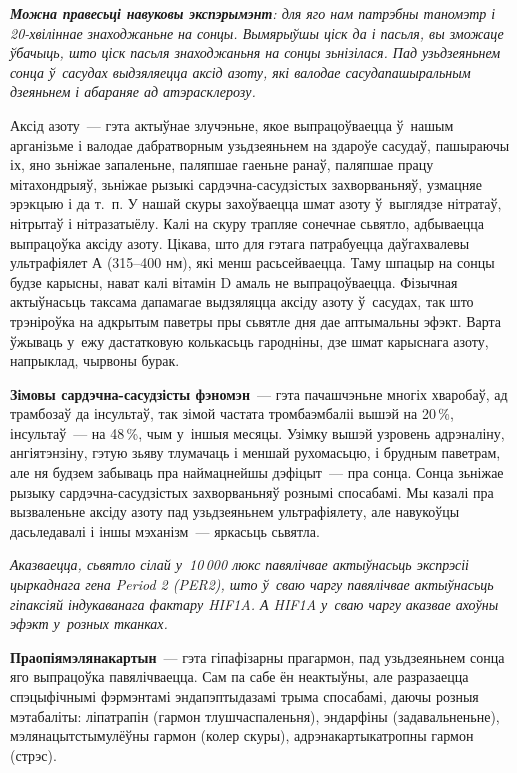 \emph{\textbf{Можна правесьці навуковы экспэрымэнт}: для яго нам патрэбны таномэтр і 20-хвіліннае знаходжаньне на сонцы. Вымярыўшы ціск да і пасьля, вы зможаце ўбачыць, што ціск пасьля знаходжаньня на сонцы зьнізілася. Пад узьдзеяньнем сонца ў~сасудах выдзяляецца аксід азоту, які валодае сасудапашыральным дзеяньнем і абараняе ад атэрасклерозу.}

Аксід азоту~--- гэта актыўнае злучэньне, якое выпрацоўваецца ў~нашым арганізьме і валодае дабратворным узьдзеяньнем на здароўе сасудаў, пашыраючы іх, яно зьніжае запаленьне, паляпшае гаеньне ранаў, паляпшае працу мітахондрыяў, зьніжае рызыкі сардэчна-сасудзістых захворваньняў, узмацняе эрэкцыю і да т.~п. У нашай скуры захоўваецца шмат азоту ў~выглядзе нітратаў, нітрытаў і нітразатыёлу. Калі на скуру трапляе сонечнае сьвятло, адбываецца выпрацоўка аксіду азоту. Цікава, што для гэтага патрабуецца даўгахвалевы ультрафіялет А (315--400 нм), які менш расьсейваецца. Таму шпацыр на сонцы будзе карысны, нават калі вітамін D амаль не выпрацоўваецца. Фізычная актыўнасьць таксама дапамагае выдзяляцца аксіду азоту ў~сасудах, так што трэніроўка на адкрытым паветры пры сьвятле дня дае аптымальны эфэкт. Варта ўжываць у~ежу дастатковую колькасьць гародніны, дзе шмат карыснага азоту, напрыклад, чырвоны бурак.

\textbf{Зімовы сардэчна-сасудзісты фэномэн}~--- гэта пачашчэньне многіх хваробаў, ад трамбозаў да інсультаў, так зімой частата тромбаэмбаліі вышэй на 20\,\%, інсультаў~--- на 48\,\%, чым у~іншыя месяцы. Узімку вышэй узровень адрэналіну, ангіятэнзіну, гэтую зьяву тлумачаць і меншай рухомасьцю, і брудным паветрам, але ня будзем забываць пра наймацнейшы дэфіцыт~--- пра сонца. Сонца зьніжае рызыку сардэчна-сасудзістых захворваньняў рознымі спосабамі. Мы казалі пра вызваленьне аксіду азоту пад узьдзеяньнем ультрафіялету, але навукоўцы дасьледавалі і іншы мэханізм~--- яркасьць сьвятла.

\emph{Аказваецца, сьвятло сілай у~10\,000 люкс павялічвае актыўнасьць экспрэсіі цыркаднага гена Period 2 (PER2), што ў~сваю чаргу павялічвае актыўнасьць гіпаксіяй індукаванага фактару HIF1A. А HIF1A у~сваю чаргу аказвае ахоўны эфэкт у~розных тканках.}


\textbf{Праопіямэлянакартын}~--- гэта гіпафізарны прагармон, пад узьдзеяньнем сонца яго выпрацоўка павялічваецца. Сам па сабе ён неактыўны, але разразаецца спэцыфічнымі фэрмэнтамі эндапэптыдазамі трыма спосабамі, даючы розныя мэтабаліты: ліпатрапін (гармон тлушчаспаленьня), эндарфіны (задавальненьне), мэлянацытстымулёўны гармон (колер скуры), адрэнакартыкатропны гармон (стрэс).

